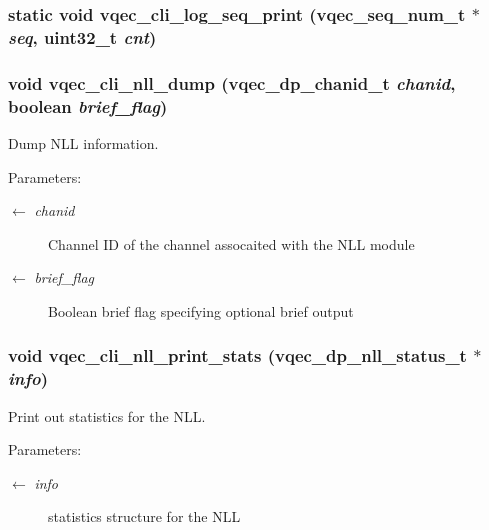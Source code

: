 \subsubsection{\setlength{\rightskip}{0pt plus 5cm}static void vqec\_\-cli\_\-log\_\-seq\_\-print (vqec\_\-seq\_\-num\_\-t $\ast$ {\em seq}, uint32\_\-t {\em cnt})\hspace{0.3cm}{\tt  [static]}}\label{vqec__cli__interface_8c_fdf3590e313b3793ea9caf4f3efff190}


\subsubsection{\setlength{\rightskip}{0pt plus 5cm}void vqec\_\-cli\_\-nll\_\-dump (vqec\_\-dp\_\-chanid\_\-t {\em chanid}, boolean {\em brief\_\-flag})}\label{vqec__cli__interface_8c_01a294c164c64d538c527fcc67fe8e54}


Dump NLL information.

\begin{Desc}
\item[Parameters:]
\begin{description}
\item[\mbox{$\leftarrow$} {\em chanid}]Channel ID of the channel assocaited with the NLL module \item[\mbox{$\leftarrow$} {\em brief\_\-flag}]Boolean brief flag specifying optional brief output \end{description}
\end{Desc}
\subsubsection{\setlength{\rightskip}{0pt plus 5cm}void vqec\_\-cli\_\-nll\_\-print\_\-stats (vqec\_\-dp\_\-nll\_\-status\_\-t $\ast$ {\em info})}\label{vqec__cli__interface_8c_07bffba071684f5d99949115f560a3b5}


Print out statistics for the NLL.

\begin{Desc}
\item[Parameters:]
\begin{description}
\item[\mbox{$\leftarrow$} {\em info}]statistics structure for the NLL \end{description}
\end{Desc}
